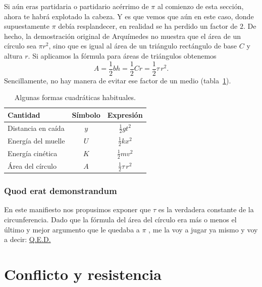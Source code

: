 Si aún eras partidaria o partidario acérrimo de  $\pi$ al comienzo de esta sección, ahora te habrá explotado la cabeza. Y es que vemos que aún en este caso, donde supuestamente $\pi$ debía resplandecer, en realidad se ha perdido un factor de $2$. De hecho, la demostración original de Arquímedes no muestra que el área de un círculo sea $\pi r^2$, sino que es igual al área de un triángulo rectángulo de base $C$ y altura $r$. Si aplicamos la fórmula para áreas de triángulos obtenemos
\[
  A = \textstyle{\frac{1}{2}} bh = \textstyle{\frac{1}{2}}Cr = \textstyle{\frac{1}{2}}\tau\,r^2.
\]
Sencillamente, no hay manera de evitar ese factor de un medio (tabla~\ref{table:quadratic_forms}).

\begin{table}
\begin{center}
\begin{tabular}{lcc}
Cantidad & Símbolo & Expresión \\ \hline
Distancia en caída & $y$ & $\textstyle{\frac{1}{2}}gt^2$ \smallskip \\
Energía del muelle & $U$ & $\textstyle{\frac{1}{2}}kx^2$ \smallskip \\
Energía cinética & $K$ & $\textstyle{\frac{1}{2}}mv^2$ \smallskip \\
Área del círculo & $A$ & $\textstyle{\frac{1}{2}}\tau\,r^2$
\end{tabular}
\end{center}
\caption{Algunas formas cuadráticas habituales.\label{table:quadratic_forms}}
\end{table}

    \subsubsection{Quod erat demonstrandum} %
    \label{sec:quod_erat_demonstrandum}

En este manifiesto nos propusimos exponer que $\tau$ es la verdadera constante de la circunferencia. Dado que la fórmula del área del círculo era más o menos el último y mejor argumento que le quedaba a $\pi$ , me la voy a jugar ya mismo y voy a decir: \href{https://es.wikipedia.org/wiki/Quod_erat_demonstrandum}{Q.E.D.}



\section{Conflicto y resistencia} %
\label{sec:conflict_and_resistance}

